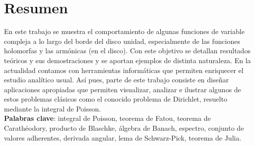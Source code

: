 %
%
%
%
%

\chapter{Resumen}

En este trabajo se muestra el comportamiento de algunas funciones de variable compleja a lo largo del borde del disco unidad, especialmente de las funciones holomorfas y las armónicas (en el disco). Con este objetivo se detallan resultados teóricos y sus demostraciones y se aportan ejemplos de distinta naturaleza. En la actualidad contamos con herramientas informáticas que permiten enriquecer el estudio analítico usual. Así pues, parte de este trabajo consiste en diseñar aplicaciones apropiadas que permiten visualizar, analizar e ilustrar algunos de estos problemas clásicos como el conocido problema de Dirichlet, resuelto mediante la integral de Poisson. \\

\textbf{Palabras clave}: integral de Poisson, teorema de Fatou, teorema de Carathéodory, producto de Blaschke, álgebra de Banach, espectro, conjunto de valores adherentes, derivada angular, lema de Schwarz-Pick, teorema de Julia. \\

\endinput
